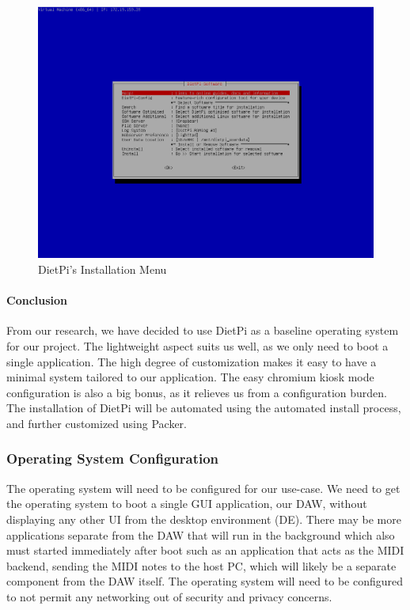 \begin{figure}[h!]
  \centering
  \includegraphics[width=\linewidth]{image/dietpi-config.png}
  \caption{DietPi's Installation Menu}
  \label{fig:dietpi}
\end{figure}

\paragraph{Conclusion}

From our research, we have decided to use DietPi as a baseline operating system for our
project. The lightweight aspect suits us well, as we only need to boot a single
application. The high degree of customization makes it easy to have a minimal system
tailored to our application. The easy chromium kiosk mode configuration is also a big
bonus, as it relieves us from a configuration burden. The installation of DietPi will be
automated using the automated install process, and further customized using Packer.

\subsubsection{Operating System Configuration}
\label{sec:research:subsec:os_config}

The operating system will need to be configured for our use-case. We need to get the
operating system to boot a single GUI application, our DAW, without displaying any other
UI from the desktop environment (DE). There may be more applications separate from the DAW
that will run in the background which also must started immediately after boot such as an
application that acts as the MIDI backend, sending the MIDI notes to the host PC, which
will likely be a separate component from the DAW itself. The operating system will need to
be configured to not permit any networking out of security and privacy concerns.

